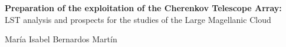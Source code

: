 \documentclass[12pt,fleqn,aas_macros]{book} %
\begin{document}
\begingroup
\thispagestyle{empty}
\centering
\vspace*{5cm}
\par\normalfont\fontsize{32}{32}\sffamily\selectfont
\textbf{Preparation of the exploitation of the Cherenkov Telescope Array:}\\
{\LARGE LST analysis and prospects for the studies of the Large Magellanic Cloud}\par %
\vspace*{0.7cm}
{\Huge María Isabel Bernardos Martín}\par %
\endgroup


\newpage
~\vfill
\thispagestyle{empty}
\end{document}
